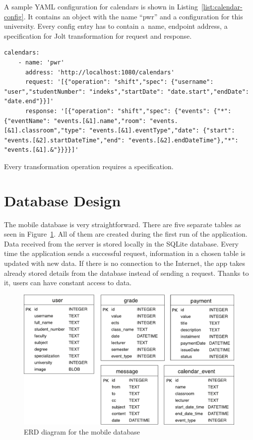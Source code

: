 A sample YAML configuration for calendars is shown in Listing~\ref{list:calendar-config}. It contains an object with the name ``pwr'' and a configuration for this university. Every config entry has to contain a~name, endpoint address, a specification for Jolt transformation for request and response.

\begin{lstlisting}[label=list:calendar-config,caption=Sample YAML configuration for calendars]
calendars:
    - name: 'pwr'
      address: 'http://localhost:1080/calendars'
      request: '[{"operation": "shift","spec": {"username": "user","studentNumber": "indeks","startDate": "date.start","endDate": "date.end"}}]'
      response: '[{"operation": "shift","spec": {"events": {"*": {"eventName": "events.[&1].name","room": "events.[&1].classroom","type": "events.[&1].eventType","date": {"start": "events.[&2].startDateTime","end": "events.[&2].endDateTime"},"*": "events.[&1].&"}}}}]'
\end{lstlisting}

Every transformation operation requires a specification.


\section{Database Design}
The mobile database is very straightforward. There are five separate tables as seen in Figure~\ref{fig:erd-diagram}. All of them are created during the first run of the application. Data received from the server is stored locally in the SQLite database. Every time the application sends a successful request, information in a chosen table is updated with new data. If there is no connection to the Internet, the app takes already stored details from the database instead of sending a request. Thanks to it, users can have constant access to data.
\begin{figure}[htb]
    \centering
    \includegraphics[scale=0.7]{fig03/erd_diagram.pdf}
    \caption{ERD diagram for the mobile database}
    \label{fig:erd-diagram}
\end{figure}

